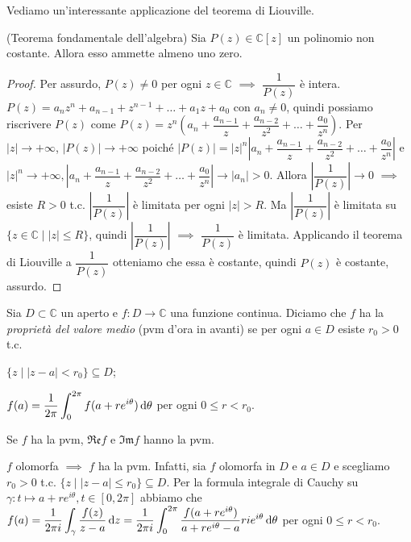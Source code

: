 Vediamo un'interessante applicazione del teorema di Liouville.

\begin{thm}
  (Teorema fondamentale dell'algebra) Sia $P(z) \in \mathbb{C}[z]$ un polinomio non costante. Allora esso ammette almeno uno zero.
\end{thm}

\begin{proof}
  Per assurdo, $P(z) \not=0$ per ogni $z \in \mathbb{C}$ $\implies$ $\dfrac{1}{P(z)}$ è intera.
  $P(z)=a_nz^n+a_{n-1}+z^{n-1}+\dots+a_1z+a_0$ con $a_n\not=0$, quindi possiamo riscrivere $P(z)$ come $P(z)=z^n\left(a_n+\dfrac{a_{n-1}}{z}+\dfrac{a_{n-2}}{z^2}+\dots+\dfrac{a_0}{z^n}\right)$.
  Per $|z| \longrightarrow +\infty$, $|P(z)| \longrightarrow +\infty$ poiché $|P(z)|=|z|^n\left|a_n+\dfrac{a_{n-1}}{z}+\dfrac{a_{n-2}}{z^2}+\dots+\dfrac{a_0}{z^n}\right|$ e $|z|^n \longrightarrow +\infty, \left|a_n+\dfrac{a_{n-1}}{z}+\dfrac{a_{n-2}}{z^2}+\dots+\dfrac{a_0}{z^n}\right| \longrightarrow |a_n|>0$.
  Allora $\left|\dfrac{1}{P(z)}\right| \longrightarrow 0$ $\implies$ esiste $R>0$ t.c. $\left|\dfrac{1}{P(z)}\right|$ è limitata per ogni $|z|>R$.
  Ma $\left|\dfrac{1}{P(z)}\right|$ è limitata su $\{z \in \mathbb{C} \mid |z| \le R\}$, quindi $\left|\dfrac{1}{P(z)}\right|$ $\implies$ $\dfrac{1}{P(z)}$ è limitata. Applicando il teorema di Liouville a $\dfrac{1}{P(z)}$ otteniamo che essa è costante, quindi $P(z)$ è costante, assurdo.
\end{proof}

\begin{defn}
  Sia $D \subset \mathbb{C}$ un aperto e $f:D \longrightarrow \mathbb{C}$ una funzione continua. Diciamo che $f$ ha la \textit{proprietà del valore medio} (pvm d'ora in avanti) se per ogni $a \in D$ esiste $r_0>0$ t.c.
  \begin{nlist}
    \item $\{z \mid |z-a|<r_0\} \subseteq D$;
    \item $\displaystyle f(a)=\dfrac{1}{2\pi}\int_0^{2\pi} f(a+re^{i\theta})\mathop{}\!\mathrm{d}\theta$ per ogni $0 \le r<r_0$.
  \end{nlist}
\end{defn}

\begin{oss}
  Se $f$ ha la pvm, $\mathfrak{Re}f$ e $\mathfrak{Im}f$ hanno la pvm.
\end{oss}

\begin{oss}
  $f$ olomorfa $\implies$ $f$ ha la pvm. Infatti, sia $f$ olomorfa in $D$ e $a \in D$ e scegliamo $r_0>0$ t.c. $\{z \mid |z-a| \le r_0\}\subseteq D$.
  Per la formula integrale di Cauchy su $\gamma:t \longmapsto a+re^{i\theta}, t \in [0,2\pi]$ abbiamo che $\displaystyle f(a)=\dfrac{1}{2\pi i}\int_{\gamma} \dfrac{f(z)}{z-a}\mathop{}\!\mathrm{d} z=\dfrac{1}{2\pi i}\int_0^{2\pi} \dfrac{f(a+re^{i\theta})}{a+re^{i\theta}-a}rie^{i\theta}\mathop{}\!\mathrm{d}\theta$ per ogni $0 \le r <r_0$.
\end{oss}

